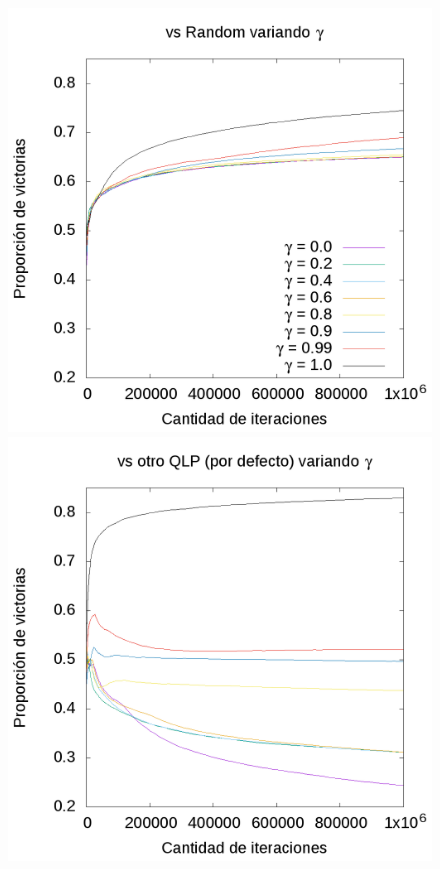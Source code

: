 \documentclass[10pt, a4paper]{article}
\begin{document}
\begin{figure}[ht]
 \centering
  \begin{minipage}[c]{1\textwidth}
	\includegraphics[scale=0.32]{GammaR.png}
	\includegraphics[scale=0.32]{GammaQ.png}
  \end{minipage}
\end{figure}
\end{document}
